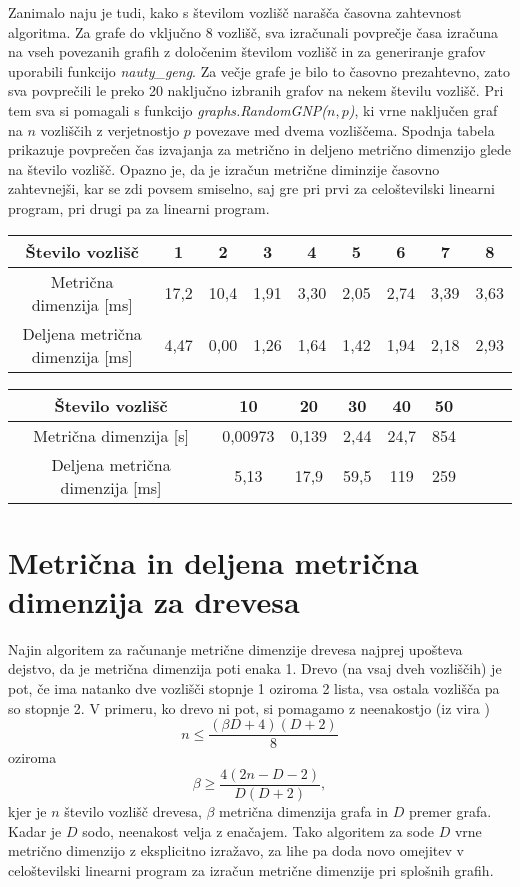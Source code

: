 \documentclass[a4paper]{report}
\begin{document}
Zanimalo naju je tudi, kako s številom vozlišč narašča časovna zahtevnost algoritma. Za grafe do vključno 8 vozlišč, sva izračunali povprečje časa izračuna na vseh povezanih grafih z določenim številom vozlišč in za generiranje grafov uporabili funkcijo \textit{nauty\_geng}. Za večje grafe je bilo to časovno prezahtevno, zato sva povprečili le preko 20 naključno izbranih grafov na nekem številu vozlišč. Pri tem sva si pomagali s funkcijo \textit{graphs.RandomGNP($n, p$)}, ki vrne naključen graf na $n$ vozliščih z verjetnostjo $p$ povezave med dvema vozliščema. Spodnja tabela prikazuje povprečen čas izvajanja za metrično in deljeno metrično dimenzijo glede na število vozlišč. Opazno je, da je izračun metrične diminzije časovno zahtevnejši, kar se zdi povsem smiselno, saj gre pri prvi za celoštevilski linearni program, pri drugi pa za linearni program.

\begin{center}
\resizebox{12.3cm}{!} {
\begin{tabular}{||c| |*{8}{c|}|}
\hline\hline
Število vozlišč & 1 & 2 & 3 & 4 & 5 & 6 & 7 & 8 \\
\hline
Metrična dimenzija [ms] & 17,2 & 10,4 & 1,91 & 3,30 & 2,05 & 2,74 & 3,39 & 3,63 \\
\hline
Deljena metrična dimenzija [ms] & 4,47 & 0,00 & 1,26 & 1,64 & 1,42 & 1,94 & 2,18 & 2,93 \\
\hline\hline
\end{tabular}}
\end{center}

\begin{center}
\resizebox{12.3cm}{!} {
\begin{tabular}{||c| |*{8}{c|}|}
\hline\hline
Število vozlišč & 10 & 20 & 30 & 40 & 50 \\
\hline
Metrična dimenzija [s] & 0,00973 & 0,139 & 2,44 & 24,7 & 854\\
\hline
Deljena metrična dimenzija [ms] & 5,13 & 17,9 & 59,5 & 119 & 259 \\
\hline\hline
\end{tabular}}
\end{center}

\section*{Metrična in deljena metrična dimenzija za drevesa}

Najin algoritem za računanje metrične dimenzije drevesa najprej upošteva dejstvo, da je metrična dimenzija poti enaka 1. Drevo (na vsaj dveh vozliščih) je pot, če ima natanko dve vozlišči stopnje 1 oziroma 2 lista, vsa ostala vozlišča pa so stopnje 2. V primeru, ko drevo ni pot, si pomagamo z neenakostjo (iz vira \cite{1}) $$n \le \frac{( \beta D + 4)(D + 2)}{8}$$ oziroma $$\beta \ge \frac{4(2n - D - 2)}{D(D + 2)},$$ kjer je $n$ število vozlišč drevesa, $\beta$ metrična dimenzija grafa in $D$ premer grafa. Kadar je $D$ sodo, neenakost velja z enačajem. Tako algoritem za sode $D$ vrne metrično dimenzijo z eksplicitno izražavo, za lihe pa doda novo omejitev v celoštevilski linearni program za izračun metrične dimenzije pri splošnih grafih.\\
\end{document}
